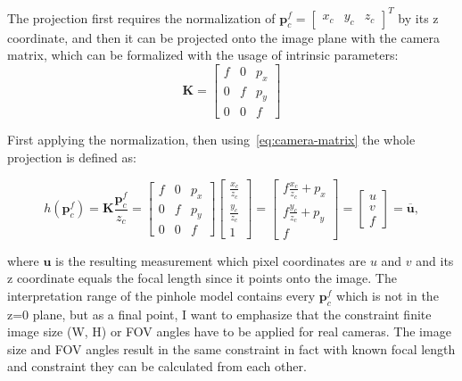 The projection first requires the normalization of $\mathbf{p}_c^f=\begin{bmatrix} x_c & y_c & z_c\end{bmatrix}^T$ by its z coordinate, and then it can be projected onto the image plane with the camera matrix, which can be formalized with the usage of intrinsic parameters:
\begin{equation}
    \mathbf{K}=\begin{bmatrix}
        f & 0 & p_x \\
        0 & f & p_y \\
        0 & 0 & f 
    \end{bmatrix}
    \label{eq:camera-matrix}
\end{equation}

First applying the normalization, then using~\eqref{eq:camera-matrix} the whole projection is defined as:

\begin{equation}
    h(\mathbf{p}_c^f)=\mathbf{K}\frac{\mathbf{p}_c^f}{z_c}=\begin{bmatrix}
        f & 0 & p_x \\
        0 & f & p_y \\
        0 & 0 & f
    \end{bmatrix}\begin{bmatrix}
        \frac{x_c}{z_c} \\ \frac{y_c}{z_c} \\ 1 
    \end{bmatrix}=\begin{bmatrix}
        f\frac{x_c}{z_c}+p_x \\
        f\frac{y_c}{z_c}+p_y \\
        f
    \end{bmatrix}=\begin{bmatrix}
        u \\ v \\ f
    \end{bmatrix}=\overline{\mathbf{u}},
    \label{eq:pinhole-projection}
\end{equation}

where $\mathbf{u}$ is the resulting measurement which pixel coordinates are $u$ and $v$ and its z coordinate equals the focal length since it points onto the image. The interpretation range of the pinhole model contains every $\mathbf{p}_c^f$ which is not in the z=0 plane, but as a final point, I want to emphasize that the constraint finite image size (W, H) or FOV angles have to be applied for real cameras. The image size and FOV angles result in the same constraint in fact with known focal length and constraint they can be calculated from each other.

